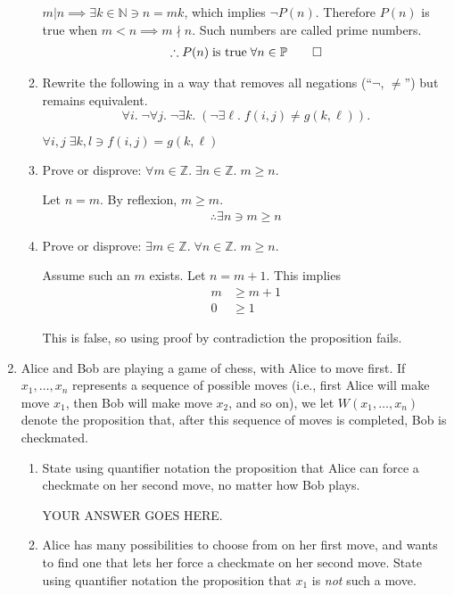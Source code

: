 \documentclass[11pt,fleqn]{article}
\newcommand{\N}{\mathbb{N}}
\newcommand{\Z}{\mathbb{Z}}
\begin{document}
\begin{enumerate}
\begin{enumerate}
$m | n \implies \exists k \in \N \ni n=mk$, which implies $\lnot P(n)$.  Therefore $P(n)$ is true when $m<n \implies m \nmid n$.  Such numbers are called prime numbers.
\begin{align}
\therefore P(n)\;\text{is true}\;\forall n \in \mathbb{P}\qed
\end{align}

\item Rewrite the following in a way that
removes all negations (``$\neg$, $\ne$'') but remains equivalent.
\[ \forall i . \; \neg \forall j . \;
\neg \exists k . \; 
(\neg \exists \ell . \; f(i,j) \ne g(k,\ell)). \]

$\forall i,j\;\exists k,l \ni f(i,j) = g(k,\ell)$

\item Prove or disprove:
$\forall m \in \Z . \; \exists n \in \Z . \; m \ge n$.

Let $n = m$.  By reflexion, $m \ge m$.
\begin{align}
\therefore \exists n \ni m \ge n
\end{align}

\item Prove or disprove:
$\exists m \in \Z . \; \forall n \in \Z . \; m \ge n$.

Assume such an $m$ exists.  Let $n = m+1$.  This implies
\begin{align}
  m &\ge m+1\\
  0 &\ge 1
\end{align}

This is false, so using proof by contradiction the proposition fails.

\end{enumerate}

\item
Alice and Bob are playing a game of chess,
with Alice to move first.
If $x_1,\dots,x_n$ represents a sequence of possible moves
(i.e., first Alice will make move $x_1$, then Bob will make move $x_2$,
and so on),
we let $W(x_1,\dots,x_n)$ denote the proposition that,
after this sequence of moves is completed,
Bob is checkmated.
\begin{enumerate}
\item State using quantifier notation the proposition that Alice
can force a checkmate on her second move, no matter how Bob plays.

YOUR ANSWER GOES HERE.

\item Alice has many possibilities to choose from on her first move,
and wants to find one that lets her force a checkmate on her second move.
State using quantifier notation the proposition that $x_1$
is \emph{not} such a move.


\end{enumerate}
\end{enumerate}
\end{document}
